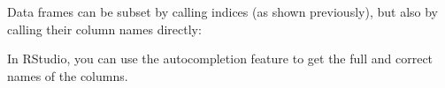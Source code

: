 \documentclass[]{book}
\newenvironment{Shaded}{\begin{snugshade}}{\end{snugshade}}
\newcommand{\StringTok}[1]{\textcolor[rgb]{0.31,0.60,0.02}{#1}}
\newcommand{\CommentTok}[1]{\textcolor[rgb]{0.56,0.35,0.01}{\textit{#1}}}
\newcommand{\OperatorTok}[1]{\textcolor[rgb]{0.81,0.36,0.00}{\textbf{#1}}}
\newcommand{\NormalTok}[1]{#1}
\begin{document}
Data frames can be subset by calling indices (as shown previously), but
also by calling their column names directly:

\begin{Shaded}
\end{Shaded}

In RStudio, you can use the autocompletion feature to get the full and
correct names of the columns.
\end{document}

